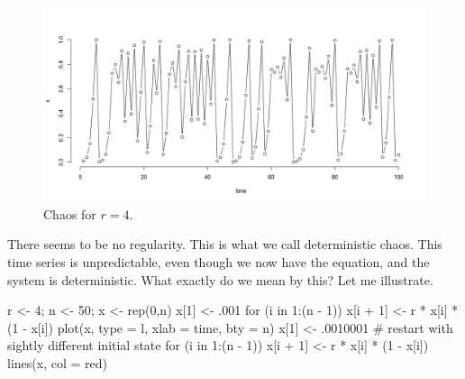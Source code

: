 \documentclass[
  letterpaper,
]{scrbook}
\newenvironment{Shaded}{\begin{snugshade}}{\end{snugshade}}
\newcommand{\AttributeTok}[1]{\textcolor[rgb]{0.40,0.45,0.13}{#1}}
\newcommand{\CommentTok}[1]{\textcolor[rgb]{0.37,0.37,0.37}{#1}}
\newcommand{\ControlFlowTok}[1]{\textcolor[rgb]{0.00,0.23,0.31}{#1}}
\newcommand{\DecValTok}[1]{\textcolor[rgb]{0.68,0.00,0.00}{#1}}
\newcommand{\FunctionTok}[1]{\textcolor[rgb]{0.28,0.35,0.67}{#1}}
\newcommand{\NormalTok}[1]{\textcolor[rgb]{0.00,0.23,0.31}{#1}}
\newcommand{\OtherTok}[1]{\textcolor[rgb]{0.00,0.23,0.31}{#1}}
\newcommand{\SpecialCharTok}[1]{\textcolor[rgb]{0.37,0.37,0.37}{#1}}
\newcommand{\StringTok}[1]{\textcolor[rgb]{0.13,0.47,0.30}{#1}}
\begin{document}
\begin{figure}

{\centering \includegraphics[width=4.43857in,height=2.25176in]{media/ch2/image5.jpg}

}

\caption{\label{fig-ch2-img5}Chaos for \(r = 4\).}

\end{figure}

There seems to be no regularity. This is what we call deterministic
chaos. This time series is unpredictable, even though we now have the
equation, and the system is deterministic. What exactly do we mean by
this? Let me illustrate.

\begin{Shaded}
\begin{Highlighting}[]
\NormalTok{r }\OtherTok{\textless{}{-}} \DecValTok{4}\NormalTok{;  n }\OtherTok{\textless{}{-}} \DecValTok{50}\NormalTok{; x }\OtherTok{\textless{}{-}} \FunctionTok{rep}\NormalTok{(}\DecValTok{0}\NormalTok{,n)}
\NormalTok{x[}\DecValTok{1}\NormalTok{] }\OtherTok{\textless{}{-}}\NormalTok{ .}\DecValTok{001}
\ControlFlowTok{for}\NormalTok{ (i }\ControlFlowTok{in} \DecValTok{1}\SpecialCharTok{:}\NormalTok{(n }\SpecialCharTok{{-}} \DecValTok{1}\NormalTok{))}
\NormalTok{  x[i }\SpecialCharTok{+} \DecValTok{1}\NormalTok{] }\OtherTok{\textless{}{-}}\NormalTok{ r }\SpecialCharTok{*}\NormalTok{ x[i] }\SpecialCharTok{*}\NormalTok{ (}\DecValTok{1} \SpecialCharTok{{-}}\NormalTok{ x[i])}
\FunctionTok{plot}\NormalTok{(x, }\AttributeTok{type =} \StringTok{\textquotesingle{}l\textquotesingle{}}\NormalTok{, }\AttributeTok{xlab =} \StringTok{\textquotesingle{}time\textquotesingle{}}\NormalTok{, }\AttributeTok{bty =} \StringTok{\textquotesingle{}n\textquotesingle{}}\NormalTok{)}
\NormalTok{x[}\DecValTok{1}\NormalTok{] }\OtherTok{\textless{}{-}}\NormalTok{ .}\DecValTok{0010001}
\CommentTok{\# restart with sightly different initial state}
\ControlFlowTok{for}\NormalTok{ (i }\ControlFlowTok{in} \DecValTok{1}\SpecialCharTok{:}\NormalTok{(n }\SpecialCharTok{{-}} \DecValTok{1}\NormalTok{))}
\NormalTok{  x[i }\SpecialCharTok{+} \DecValTok{1}\NormalTok{] }\OtherTok{\textless{}{-}}\NormalTok{ r }\SpecialCharTok{*}\NormalTok{ x[i] }\SpecialCharTok{*}\NormalTok{ (}\DecValTok{1} \SpecialCharTok{{-}}\NormalTok{ x[i])}
\FunctionTok{lines}\NormalTok{(x, }\AttributeTok{col =} \StringTok{\textquotesingle{}red\textquotesingle{}}\NormalTok{)}
\end{Highlighting}
\end{Shaded}
\end{document}
